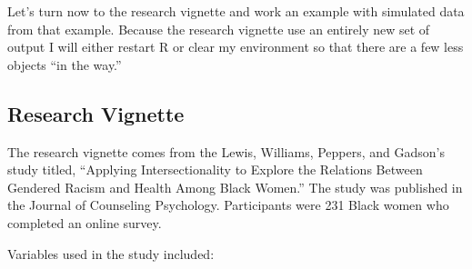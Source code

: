 \documentclass[
  11pt,
]{book}
\begin{document}
Let's turn now to the research vignette and work an example with simulated data from that example. Because the research vignette use an entirely new set of output I will either restart R or clear my environment so that there are a few less objects ``in the way.''

\hypertarget{research-vignette-5}{%
\subsection{Research Vignette}\label{research-vignette-5}}

The research vignette comes from the Lewis, Williams, Peppers, and Gadson's \citeyearpar{lewis_applying_2017} study titled, ``Applying Intersectionality to Explore the Relations Between Gendered Racism and Health Among Black Women.'' The study was published in the Journal of Counseling Psychology. Participants were 231 Black women who completed an online survey.

Variables used in the study included:
\end{document}
